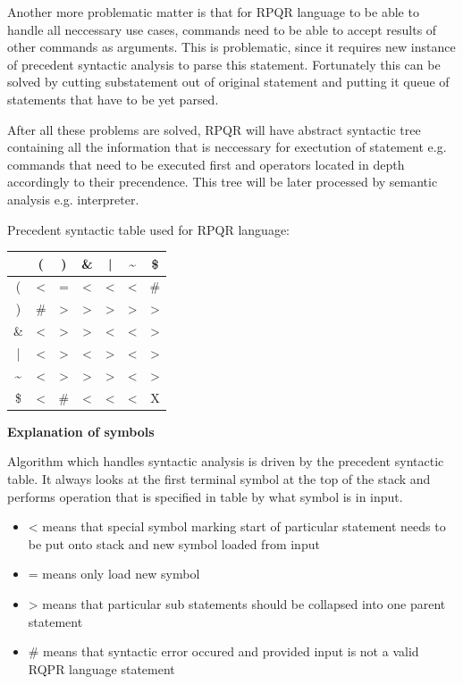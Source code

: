 Another more problematic matter is that for RPQR language to be able to handle all neccessary use cases,
commands need to be able to accept results of other commands as arguments. This is problematic, since
it requires new instance of precedent syntactic analysis to parse this statement. Fortunately this
can be solved by cutting substatement out of original statement and putting it queue of statements
that have to be yet parsed.

After all these problems are solved, RPQR will have abstract syntactic tree containing all the information
that is neccessary for exectution of statement e.g. commands that need to be executed first and operators
located in depth accordingly to their precendence. This tree will be later processed by semantic
analysis e.g. interpreter.

\newpage

Precedent syntactic table used for RPQR language:

\begin{center}
  \begin{tabular}{ |c|c|c|c|c|c|c| }
   \hline
     & ( & ) & \& & | & \textasciitilde & \$ \\
     \hline
  (  & < & = & <  & <  & <  & \#  \\
  \hline
  )  & \# & > & >  & >  & >  & >  \\  
  \hline
  \& & < & > & >  & <  & <  & >  \\
  \hline
  |  & < & > & <  & >  & <  & >  \\
  \hline
  \textasciitilde  & < & > & >  & >  & <  & >  \\
  \hline
  \$ & < & \# & <  & <  & <  & X \\
  \hline
  \end{tabular}
\end{center}

\textbf{Explanation of symbols}

Algorithm which handles syntactic analysis is driven by the precedent syntactic table. It always
looks at the first terminal symbol at the top of the stack and performs operation that is specified
in table by what symbol is in input.
\begin{itemize}
  \item < means that special symbol marking start of particular statement needs to be put onto stack and new symbol loaded from input
  \item = means only load new symbol
  \item > means that particular sub statements should be collapsed into one parent statement
  \item \# means that syntactic error occured and provided input is not a valid RQPR language statement
\end{itemize}

